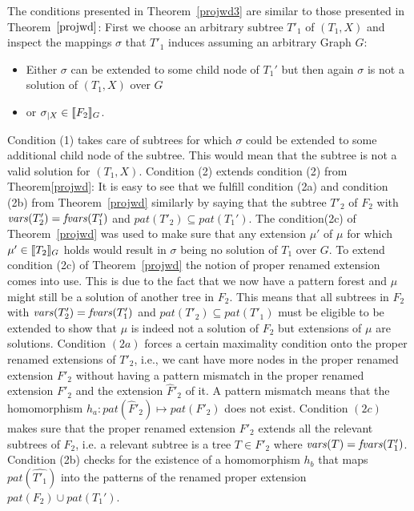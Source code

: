 \begin{proofidea}
 The conditions presented in Theorem~\ref{projwd3} are similar to those presented in
 Theorem~$\ref{projwd}$: First we choose an arbitrary subtree $T'_1$ of $(T_1,X)$ and
 inspect the mappings $\sigma$ that $T'_1$ induces assuming an arbitrary Graph
 $G$: 
 \begin{itemize}
	 \item Either $\sigma$ can be extended to some child node of $T_1'$ but then
 again $\sigma$ is not a solution of $(T_1,X)$ over $G$
	 \item  or $\sigma_{|X} \in \llbracket F_2\rrbracket_G$.
\end{itemize}
Condition (1) takes care of subtrees for which $\sigma$ could be extended
to some additional child node of the subtree. This would mean that the subtree
is not a valid solution for $(T_1,X)$.
Condition (2) extends condition (2) from Theorem\ref{projwd}:
It is easy to see that we fulfill condition (2a) and condition (2b)
from Theorem~\ref{projwd} similarly by saying that the subtree $T'_2$ of $F_2$
with $\mathit{vars}(T'_2) = \mathit{fvars}(T'_1)$ and $pat(T'_2) \subseteq pat(T_1')$.  
The condition(2c) of Theorem~\ref{projwd} was used to make sure
that any extension $\mu'$ of $\mu$ for which $\mu' \in \llbracket T_2\rrbracket_G$ holds would
result in $\sigma$ being no solution of $T_1$ over $G$. To extend
condition (2c) of Theorem~\ref{projwd} the notion of proper renamed extension
comes into use. This is due to the fact that we now have a pattern forest and
$\mu$ might still be a solution of another tree in $F_2$. This means that all
subtrees in $F_2$ with $\mathit{vars}(T'_2) = \mathit{fvars}(T'_1)$ and $pat(T'_2) \subseteq
pat(T'_1)$ must be eligible to be extended to show that $\mu$ is indeed not a
solution of $F_2$ but extensions of $\mu$ are solutions.
Condition $(2a)$ forces a certain maximality condition onto the proper renamed
extensions of $T'_2$, i.e., we cant have more nodes in the proper renamed
extension $F'_2$ without having a pattern mismatch in the proper renamed
extension $F'_2$ and
the extension $\hat{F}'_2$ of it. A pattern mismatch means that the homomorphism $h_a:
pat(\hat{F}'_2) \mapsto pat(F'_2)$ does not exist.
Condition $(2c)$ makes sure that the proper renamed extension $F'_2$
extends all the relevant subtrees of $F_2$, i.e. a relevant subtree is a tree $T
\in F'_2$ where $\mathit{vars}(T)  =\mathit{fvars}(T'_1)$.
Condition (2b) checks for the existence of a homomorphism $h_b$ that maps
$pat(\hat{T'_1})$ into the patterns of the renamed proper extension $pat(F_2)
\cup pat(T_1')$.
\end{proofidea}

